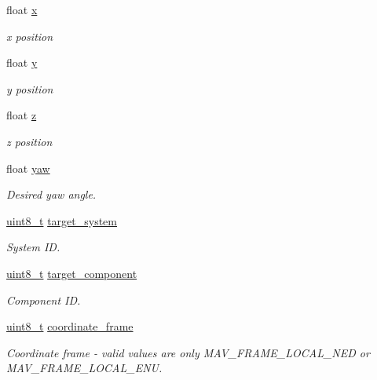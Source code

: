 \begin{DoxyCompactItemize}
\item 
float \hyperlink{struct____mavlink__set__local__position__setpoint__t_a72e5f199c95c629fd0d0f3b25bba75e7}{x}
\begin{DoxyCompactList}\small\item\em x position \end{DoxyCompactList}\item 
float \hyperlink{struct____mavlink__set__local__position__setpoint__t_a2f17c52ddd1c9b208933fd174c20f8b5}{y}
\begin{DoxyCompactList}\small\item\em y position \end{DoxyCompactList}\item 
float \hyperlink{struct____mavlink__set__local__position__setpoint__t_af83bc511f32cca92e4f66a2963ddc158}{z}
\begin{DoxyCompactList}\small\item\em z position \end{DoxyCompactList}\item 
float \hyperlink{struct____mavlink__set__local__position__setpoint__t_a022369221a1eb9e8cf5ef00b75cf7961}{yaw}
\begin{DoxyCompactList}\small\item\em Desired yaw angle. \end{DoxyCompactList}\item 
\hyperlink{stdint_8h_aba7bc1797add20fe3efdf37ced1182c5}{uint8\-\_\-t} \hyperlink{struct____mavlink__set__local__position__setpoint__t_a1dd8c3bb93acc4aa0aa9524afad5461d}{target\-\_\-system}
\begin{DoxyCompactList}\small\item\em System I\-D. \end{DoxyCompactList}\item 
\hyperlink{stdint_8h_aba7bc1797add20fe3efdf37ced1182c5}{uint8\-\_\-t} \hyperlink{struct____mavlink__set__local__position__setpoint__t_a21b41f125902f6e9695005b9df4c1430}{target\-\_\-component}
\begin{DoxyCompactList}\small\item\em Component I\-D. \end{DoxyCompactList}\item 
\hyperlink{stdint_8h_aba7bc1797add20fe3efdf37ced1182c5}{uint8\-\_\-t} \hyperlink{struct____mavlink__set__local__position__setpoint__t_af715de6975547e7e06421ea07b855898}{coordinate\-\_\-frame}
\begin{DoxyCompactList}\small\item\em Coordinate frame -\/ valid values are only M\-A\-V\-\_\-\-F\-R\-A\-M\-E\-\_\-\-L\-O\-C\-A\-L\-\_\-\-N\-E\-D or M\-A\-V\-\_\-\-F\-R\-A\-M\-E\-\_\-\-L\-O\-C\-A\-L\-\_\-\-E\-N\-U. \end{DoxyCompactList}\end{DoxyCompactItemize}


